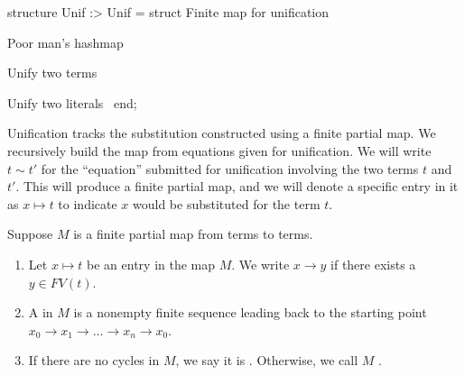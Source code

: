 \nwenddocs{}\endmoddef\nwstartdeflinemarkup\nwenddeflinemarkup
structure Unif :> Unif = struct
\LA{}Finite map for unification~{\nwtagstyle{}}\RA{}

\LA{}Poor man's hashmap~{\nwtagstyle{}}\RA{}

\LA{}Unify two terms~{\nwtagstyle{}}\RA{}

\LA{}Unify two literals~{\nwtagstyle{}}\RA{}
end;
\nwendcode{}\nwdocspar

\begin{node}
Unification tracks the substitution constructed using a finite partial
map. We recursively build the map from equations given for unification.
We will write $t\sim t'$ for the ``equation'' submitted for
unification involving the two terms $t$ and $t'$. This will produce a
finite partial map, and we will denote a specific entry in it as
$x\mapsto t$ to indicate $x$ would be substituted for the term $t$.
\end{node}

\begin{definition}
Suppose $M$ is a finite partial map from terms to terms.
\begin{enumerate}
\item Let $x\mapsto t$ be an entry in the map $M$. We write $x\to y$ if there exists a $y\in FV(t)$.
\item A  in $M$ is a nonempty finite sequence leading
  back to the starting point $x_{0}\to x_{1}\to\dots\to x_{n}\to x_{0}$.
\item If there are no cycles in $M$, we say it is . Otherwise,
  we call $M$ .
\end{enumerate}
\end{definition}

